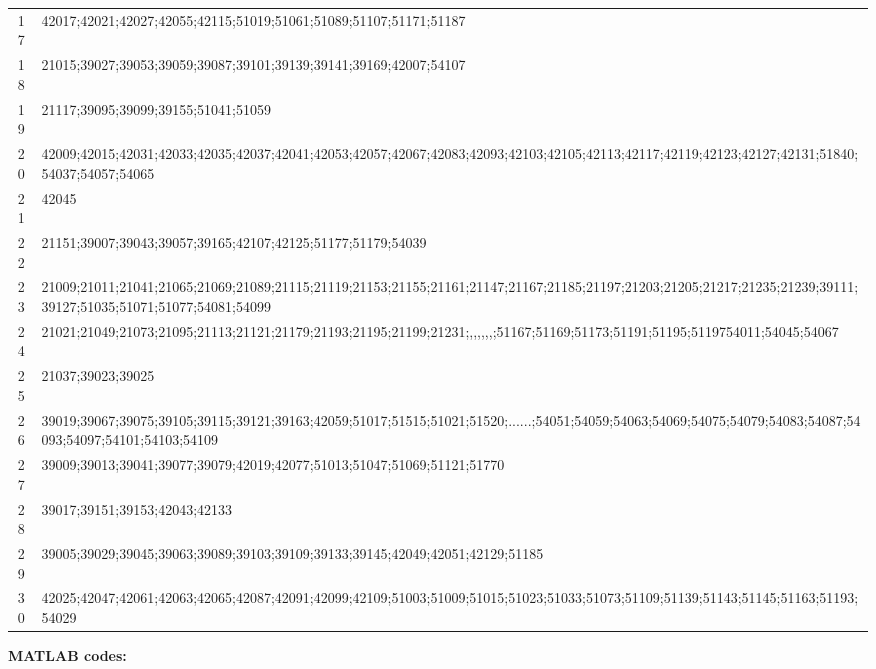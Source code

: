 \documentclass{mcmthesis}
\begin{document}
\begin{appendices}
\begin{table}[htbp!]
\begin{tabular}{clllllllllllllllllllllllllllllll}
    17    & \multicolumn{31}{l}{42017;42021;42027;42055;42115;51019;51061;51089;51107;51171;51187} \\
    18    & \multicolumn{31}{l}{21015;39027;39053;39059;39087;39101;39139;39141;39169;42007;54107} \\
    19    & \multicolumn{31}{l}{21117;39095;39099;39155;51041;51059} \\
    20    & \multicolumn{31}{l}{42009;42015;42031;42033;42035;42037;42041;42053;42057;42067;42083;42093;42103;42105;42113;42117;42119;42123;42127;42131;51840;54037;54057;54065} \\
    21    & \multicolumn{31}{l}{42045} \\
    22    & \multicolumn{31}{l}{21151;39007;39043;39057;39165;42107;42125;51177;51179;54039} \\
    23    & \multicolumn{31}{l}{21009;21011;21041;21065;21069;21089;21115;21119;21153;21155;21161;21147;21167;21185;21197;21203;21205;21217;21235;21239;39111;39127;51035;51071;51077;54081;54099} \\
    24    & \multicolumn{31}{l}{21021;21049;21073;21095;21113;21121;21179;21193;21195;21199;21231;,,,,,,;51167;51169;51173;51191;51195;5119754011;54045;54067} \\
    25    & \multicolumn{31}{l}{21037;39023;39025} \\
    26    & \multicolumn{31}{l}{39019;39067;39075;39105;39115;39121;39163;42059;51017;51515;51021;51520;......;54051;54059;54063;54069;54075;54079;54083;54087;54093;54097;54101;54103;54109} \\
    27    & \multicolumn{31}{l}{39009;39013;39041;39077;39079;42019;42077;51013;51047;51069;51121;51770} \\
    28    & \multicolumn{31}{l}{39017;39151;39153;42043;42133} \\
    29    & \multicolumn{31}{l}{39005;39029;39045;39063;39089;39103;39109;39133;39145;42049;42051;42129;51185} \\
    30    & \multicolumn{31}{l}{42025;42047;42061;42063;42065;42087;42091;42099;42109;51003;51009;51015;51023;51033;51073;51109;51139;51143;51145;51163;51193;54029} \\
    \end{tabular}%
  \label{tab:addlabel}%
\end{table}%
\textcolor[rgb]{0.98,0.00,0.00}{\textbf{MATLAB codes:}}




\end{appendices}
\end{document}

